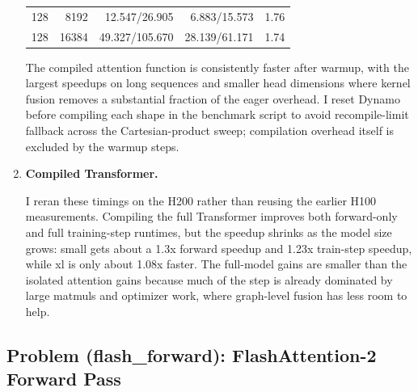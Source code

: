 \documentclass[11pt]{article}
\begin{document}
\begin{enumerate}
\begin{table}[H]
{\begin{tabular}{rrrrr}
	      128 & 8192 & 12.547/26.905 & 6.883/15.573 & 1.76 \\
	      128 & 16384 & 49.327/105.670 & 28.139/61.171 & 1.74 \\
	      \bottomrule
	    \end{tabular}
	    }
	  \end{table}
	  The compiled attention function is consistently faster after warmup, with the largest speedups on long sequences and smaller head dimensions where kernel fusion removes a substantial fraction of the eager overhead. I reset Dynamo before compiling each shape in the benchmark script to avoid recompile-limit fallback across the Cartesian-product sweep; compilation overhead itself is excluded by the warmup steps.

  \item \textbf{Compiled Transformer.}
  \begin{table}[H]
    \centering
    \caption{Compiled vs. vanilla Transformer benchmark on one H200. Context length 512, batch size 4, FP32, 5 warmup steps and 10 measured steps.}
  \end{table}
  I reran these timings on the H200 rather than reusing the earlier H100 measurements. Compiling the full Transformer improves both forward-only and full training-step runtimes, but the speedup shrinks as the model size grows: small gets about a 1.3x forward speedup and 1.23x train-step speedup, while xl is only about 1.08x faster. The full-model gains are smaller than the isolated attention gains because much of the step is already dominated by large matmuls and optimizer work, where graph-level fusion has less room to help.
\end{enumerate}

\subsection{Problem (flash\_forward): FlashAttention-2 Forward Pass}
\end{document}
